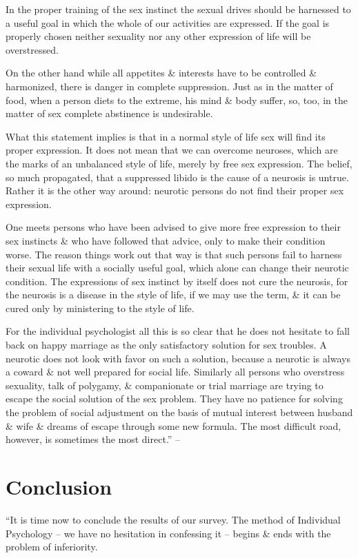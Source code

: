 \documentclass{article}
\begin{document}
In the proper training of the sex instinct the sexual drives should be harnessed to a useful goal in which the whole of our activities are expressed. If the goal is properly chosen neither sexuality nor any other expression of life will be overstressed.

On the other hand while all appetites \& interests have to be controlled \& harmonized, there is danger in complete suppression. Just as in the matter of food, when a person diets to the extreme, his mind \& body suffer, so, too, in the matter of sex complete abstinence is undesirable.

What this statement implies is that in a normal style of life sex will find its proper expression. It does not mean that we can overcome neuroses, which are the marks of an unbalanced style of life, merely by free sex expression. The belief, so much propagated, that a suppressed libido is the cause of a neurosis is untrue. Rather it is the other way around: neurotic persons do not find their proper sex expression.

One meets persons who have been advised to give more free expression to their sex instincts \& who have followed that advice, only to make their condition worse. The reason things work out that way is that such persons fail to harness their sexual life with a socially useful goal, which alone can change their neurotic condition. The expressions of sex instinct by itself does not cure the neurosis, for the neurosis is a disease in the style of life, if we may use the term, \& it can be cured only by ministering to the style of life.

For the individual psychologist all this is so clear that he does not hesitate to fall back on happy marriage as the only satisfactory solution for sex troubles. A neurotic does not look with favor on such a solution, because a neurotic is always a coward \& not well prepared for social life. Similarly all persons who overstress sexuality, talk of polygamy, \& companionate or trial marriage are trying to escape the social solution of the sex problem. They have no patience for solving the problem of social adjustment on the basis of mutual interest between husband \& wife \& dreams of escape through some new formula. The most difficult road, however, is sometimes the most direct.'' -- \cite[pp. 249--262]{Adler_science_living}


\section{Conclusion}
``It is time now to conclude the results of our survey. The method of Individual Psychology -- we have no hesitation in confessing it -- begins \& ends with the problem of inferiority.
\end{document}

